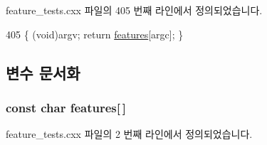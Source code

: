 feature\+\_\+tests.\+cxx 파일의 405 번째 라인에서 정의되었습니다.


\begin{DoxyCode}
405 \{ (void)argv; \textcolor{keywordflow}{return} \hyperlink{avdecc-lib_2_c_make_files_2feature__tests_8cxx_a1582568e32f689337602a16bf8a5bff0}{features}[argc]; \}
\end{DoxyCode}


\subsection{변수 문서화}
\subsubsection[{\texorpdfstring{features}{features}}]{\setlength{\rightskip}{0pt plus 5cm}const char features\mbox{[}$\,$\mbox{]}}\hypertarget{avdecc-lib_2_c_make_files_2feature__tests_8cxx_a1582568e32f689337602a16bf8a5bff0}{}\label{avdecc-lib_2_c_make_files_2feature__tests_8cxx_a1582568e32f689337602a16bf8a5bff0}


feature\+\_\+tests.\+cxx 파일의 2 번째 라인에서 정의되었습니다.

